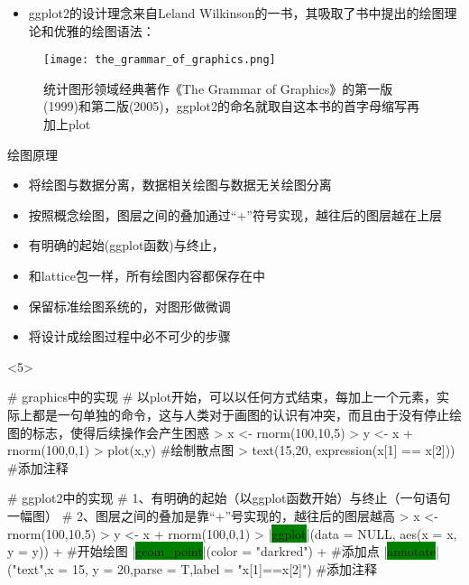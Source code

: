 \begin{frame}[t]{\subsecname}{}
\begin{itemize}
\item ggplot2的设计理念来自Leland Wilkinson的一书，其吸取了书中提出的绘图理论和优雅的绘图语法：
\end{itemize}
\begin{figure}[ht]
  \centering
  \texttt{[image: the\_grammar\_of\_graphics.png]}
  \caption{统计图形领域经典著作《The Grammar of Graphics》的第一版(1999)和第二版(2005)，ggplot2的命名就取自这本书的首字母缩写再加上plot}
\end{figure}
\end{frame}

\begin{frame}[t,fragile]{\subsecname}{绘图原理}
\begin{itemize}
\item<1-> 将绘图与数据分离，数据相关绘图与数据无关绘图分离
\item<2-> 按照概念绘图，图层之间的叠加通过“+”符号实现，越往后的图层越在上层
\item<2-> 有明确的起始(ggplot函数)与终止，
\item<3-> 和lattice包一样，所有绘图内容都保存在中
\item<4-> 保留标准绘图系统的，对图形做微调
\item<4-> 将设计成绘图过程中必不可少的步骤
\end{itemize}

\begin{overlayarea}{\textwidth}{\textheight}
\begin{onlyenv}<5>
\begin{minipage}{\textwidth}
\begin{rcode}
# graphics中的实现
# 以plot开始，可以以任何方式结束，每加上一个元素，实际上都是一句单独的命令，这与人类对于画图的认识有冲突，而且由于没有停止绘图的标志，使得后续操作会产生困惑
> x <- rnorm(100,10,5)
> y <- x + rnorm(100,0,1)
> plot(x,y)   #绘制散点图
> text(15,20, expression(x[1] == x[2])) #添加注释
\end{rcode} 
\end{minipage}

\begin{minipage}{\textwidth}
\begin{rcode}
# ggplot2中的实现
# 1、有明确的起始（以ggplot函数开始）与终止（一句语句一幅图）
# 2、图层之间的叠加是靠“+”号实现的，越往后的图层越高
> x <- rnorm(100,10,5) 
> y <- x + rnorm(100,0,1) 
> |\colorbox{green}{ggplot}|(data = NULL, aes(x = x, y = y)) +  #开始绘图
  |\colorbox{green}{geom\_point}|(color = "darkred") +  #添加点
  |\colorbox{green}{annotate}|("text",x = 15, y = 20,parse = T,label = "x[1]==x[2]") #添加注释
\end{rcode}
\end{minipage}
\end{onlyenv}
\end{overlayarea}
\end{frame}

